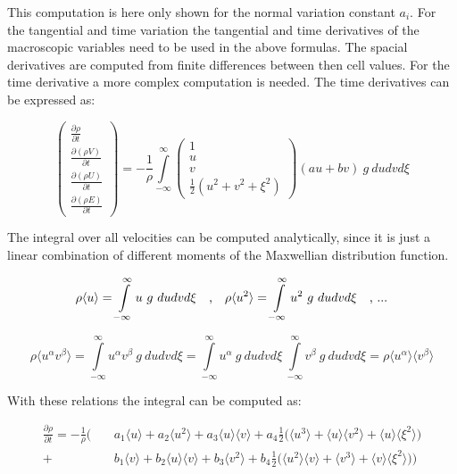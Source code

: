 \documentclass[
	pdftex,             %
	12pt,				%
	a4paper,		   	%
	english,				%
	oneside,			%
]{article}
\newcommand{\mom}[1]{\langle #1 \rangle}
\begin{document}
This computation is here only shown for the normal variation constant $a_i$. For the tangential and time variation the tangential and time derivatives of the macroscopic variables need to be used in the above formulas. The spacial derivatives are computed from finite differences between then cell values. For the time derivative a more complex computation is needed. The time derivatives can be expressed as:

\begin{equation}
\begin{pmatrix}
	\frac{\partial \rho    }{\partial t} \\
	\frac{\partial (\rho V)}{\partial t} \\
	\frac{\partial (\rho U)}{\partial t} \\
	\frac{\partial (\rho E)}{\partial t}
\end{pmatrix}
 =
 -\frac{1}{\rho}
\int \limits^{\infty}_{-\infty}
\begin{pmatrix}
	1 \\
	u \\
	v \\
	\frac{1}{2} ( u^2 + v^2 + \xi^2 )
\end{pmatrix}
(a u + b v) ~g~
du dv d\xi
\end{equation}

The integral over all velocities can be computed analytically, since it is just a linear combination of different moments of the Maxwellian distribution function.

\begin{equation}
\rho \mom{u} = \int \limits^{\infty}_{-\infty} u ~g~ du dv d\xi
~~~\textnormal{,} ~~~
\rho \mom{u^2} = \int \limits^{\infty}_{-\infty} u^2 ~g~ du dv d\xi
~~~\textnormal{, ...}
\end{equation}

\begin{equation}
\rho \mom{u^\alpha v^\beta}
= 
\int \limits^{\infty}_{-\infty} u^\alpha v^\beta ~g~ du dv d\xi
=
\int \limits^{\infty}_{-\infty} u^\alpha ~g~ du dv d\xi ~ 
\int \limits^{\infty}_{-\infty} v^\beta  ~g~ du dv d\xi
=
\rho \mom{u^\alpha}\mom{v^\beta}
\end{equation}

With these relations the integral can be computed as:

\begin{eqnarray*}
\frac{\partial \rho}{\partial t}
=
-\frac{1}{\rho}
\Bigg(
 &~&a_1 \mom{u} + a_2 \mom{u^2} + a_3 \mom{u}\mom{v}
+   a_4 \frac{1}{2} \Big( \mom{u^3} + \mom{u}\mom{v^2} + \mom{u}\mom{\xi^2} \Big)
\\
+&~&b_1 \mom{v} + b_2 \mom{u}\mom{v} + b_3 \mom{v^2}
+   b_4  \frac{1}{2} \Big( \mom{u^2}\mom{v} + \mom{v^3} + \mom{v}\mom{\xi^2} \Big)
\Bigg)
\end{eqnarray*}
\end{document}
